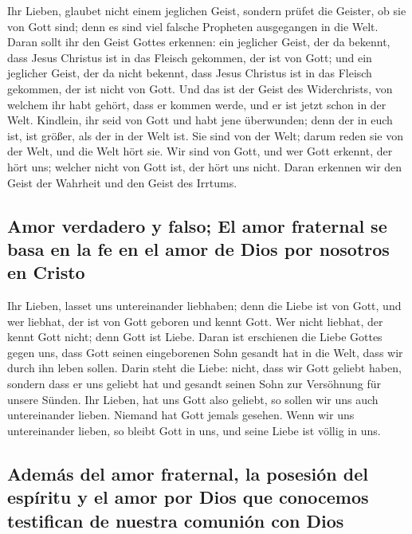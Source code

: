  Ihr Lieben, glaubet nicht einem jeglichen Geist, sondern
prüfet die Geister, ob sie von Gott sind; denn es sind viel falsche
Propheten ausgegangen in die Welt.  Daran sollt ihr den
Geist Gottes erkennen: ein jeglicher Geist, der da bekennt, dass Jesus
Christus ist in das Fleisch gekommen, der ist von Gott; 
und ein jeglicher Geist, der da nicht bekennt, dass Jesus Christus ist
in das Fleisch gekommen, der ist nicht von Gott. Und das ist der Geist
des Widerchrists, von welchem ihr habt gehört, dass er kommen werde, und
er ist jetzt schon in der Welt.  Kindlein, ihr seid von
Gott und habt jene überwunden; denn der in euch ist, ist größer, als der
in der Welt ist.  Sie sind von der Welt; darum reden sie
von der Welt, und die Welt hört sie.  Wir sind von Gott,
und wer Gott erkennt, der hört uns; welcher nicht von Gott ist, der hört
uns nicht. Daran erkennen wir den Geist der Wahrheit und den Geist des
Irrtums.

\hypertarget{amor-verdadero-y-falso-el-amor-fraternal-se-basa-en-la-fe-en-el-amor-de-dios-por-nosotros-en-cristo}{%
\subsection{Amor verdadero y falso; El amor fraternal se basa en la fe
en el amor de Dios por nosotros en
Cristo}\label{amor-verdadero-y-falso-el-amor-fraternal-se-basa-en-la-fe-en-el-amor-de-dios-por-nosotros-en-cristo}}

 Ihr Lieben, lasset uns untereinander liebhaben; denn die
Liebe ist von Gott, und wer liebhat, der ist von Gott geboren und kennt
Gott.  Wer nicht liebhat, der kennt Gott nicht; denn Gott
ist Liebe.  Daran ist erschienen die Liebe Gottes gegen
uns, dass Gott seinen eingeborenen Sohn gesandt hat in die Welt, dass
wir durch ihn leben sollen.  Darin steht die Liebe:
nicht, dass wir Gott geliebt haben, sondern dass er uns geliebt hat und
gesandt seinen Sohn zur Versöhnung für unsere Sünden. 
Ihr Lieben, hat uns Gott also geliebt, so sollen wir uns auch
untereinander lieben.  Niemand hat Gott jemals gesehen.
Wenn wir uns untereinander lieben, so bleibt Gott in uns, und seine
Liebe ist völlig in uns.

\hypertarget{ademuxe1s-del-amor-fraternal-la-posesiuxf3n-del-espuxedritu-y-el-amor-por-dios-que-conocemos-testifican-de-nuestra-comuniuxf3n-con-dios}{%
\subsection{Además del amor fraternal, la posesión del espíritu y el
amor por Dios que conocemos testifican de nuestra comunión con
Dios}\label{ademuxe1s-del-amor-fraternal-la-posesiuxf3n-del-espuxedritu-y-el-amor-por-dios-que-conocemos-testifican-de-nuestra-comuniuxf3n-con-dios}}

